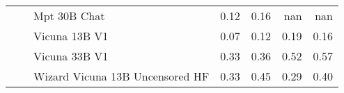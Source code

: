 \begin{table}[!htbp]
\begin{tabular}{l|l|l|rrrr}
 &  & Mpt 30B Chat & {\cellcolor[HTML]{ECECC2}} \color[HTML]{000000} 0.12 & {\cellcolor[HTML]{E7E5B2}} \color[HTML]{000000} 0.16 & {\cellcolor[HTML]{000000}} \color[HTML]{F1F1F1} nan & {\cellcolor[HTML]{000000}} \color[HTML]{F1F1F1} nan \\
 &  & Vicuna 13B V1 & {\cellcolor[HTML]{F4F4DE}} \color[HTML]{000000} 0.07 & {\cellcolor[HTML]{ECECC2}} \color[HTML]{000000} 0.12 & {\cellcolor[HTML]{E1D7AA}} \color[HTML]{000000} 0.19 & {\cellcolor[HTML]{E7E5B2}} \color[HTML]{000000} 0.16 \\
 &  & Vicuna 33B V1 & {\cellcolor[HTML]{C89387}} \color[HTML]{F1F1F1} 0.33 & {\cellcolor[HTML]{C27E7E}} \color[HTML]{F1F1F1} 0.36 & {\cellcolor[HTML]{643E3E}} \color[HTML]{F1F1F1} 0.52 & {\cellcolor[HTML]{1E0000}} \color[HTML]{F1F1F1} 0.57 \\
 &  & Wizard Vicuna 13B Uncensored HF & {\cellcolor[HTML]{C89387}} \color[HTML]{F1F1F1} 0.33 & {\cellcolor[HTML]{956060}} \color[HTML]{F1F1F1} 0.45 & {\cellcolor[HTML]{CFA791}} \color[HTML]{000000} 0.29 & {\cellcolor[HTML]{B17272}} \color[HTML]{F1F1F1} 0.40 \\
    \bottomrule
    \end{tabular}
                
\end{table}
